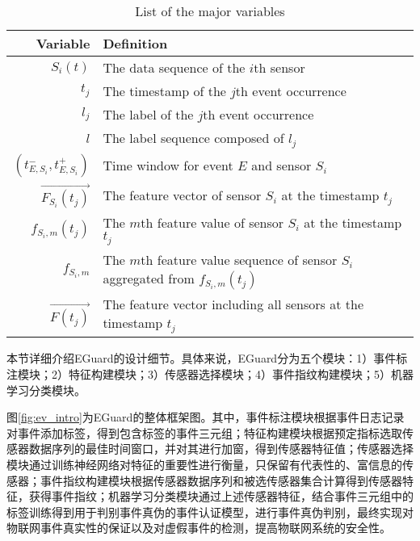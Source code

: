 \begin{table}
	\begin{center}
		\caption{List of the major variables}
		\begin{tabular}{rl}
			\toprule
			\textbf{Variable}           & \textbf{Definition}                                \\
			\midrule
			$S_i(t)$                    & The data sequence of the $i$th sensor              \\
			$t_j$                       & The timestamp of the $j$th event occurrence        \\
			$l_j$                       & The label of the $j$th event occurrence            \\
			$l$                         & The label sequence composed of $l_j$               \\
			$(t^-_{E,S_i},t^+_{E,S_i})$ & Time window for event $E$ and sensor $S_i$           \\
			$\vec{F_{S_i}(t_j)}$          & The feature vector of sensor $S_i$ at the timestamp $t_j$          \\
			$f_{S_i,m}(t_j)$              & The $m$th feature value of sensor $S_i$ at the timestamp $t_j$       \\
			$f_{S_i,m}$                 & The $m$th feature value sequence of sensor $S_i$ aggregated from $f_{S_i,m}(t_j)$ \\
			$\vec{F(t_j)}$                & The feature vector including all sensors at the timestamp $t_j$    \\
			\bottomrule
		\end{tabular}
		\label{tab:notation}
	\end{center}
\end{table}

本节详细介绍EGuard的设计细节。具体来说，EGuard分为五个模块：1）事件标注模块；2）特征构建模块；3）传感器选择模块；4）事件指纹构建模块；5）机器学习分类模块。

图\ref{fig:ev_intro}为EGuard的整体框架图。其中，事件标注模块根据事件日志记录对事件添加标签，得到包含标签的事件三元组；特征构建模块根据预定指标选取传感器数据序列的最佳时间窗口，并对其进行加窗，得到传感器特征值；传感器选择模块通过训练神经网络对特征的重要性进行衡量，只保留有代表性的、富信息的传感器；事件指纹构建模块根据传感器数据序列和被选传感器集合计算得到传感器特征，获得事件指纹；机器学习分类模块通过上述传感器特征，结合事件三元组中的标签训练得到用于判别事件真伪的事件认证模型，进行事件真伪判别，最终实现对物联网事件真实性的保证以及对虚假事件的检测，提高物联网系统的安全性。


